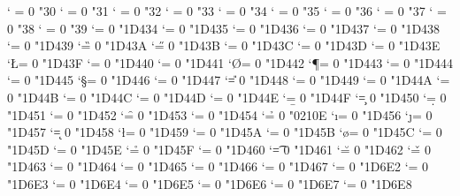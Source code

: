 \Umathcode `\0 = 0 \unimathfam "30
\Umathcode `\1 = 0 \unimathfam "31
\Umathcode `\2 = 0 \unimathfam "32
\Umathcode `\3 = 0 \unimathfam "33
\Umathcode `\4 = 0 \unimathfam "34
\Umathcode `\5 = 0 \unimathfam "35
\Umathcode `\6 = 0 \unimathfam "36
\Umathcode `\7 = 0 \unimathfam "37
\Umathcode `\8 = 0 \unimathfam "38
\Umathcode `\9 = 0 \unimathfam "39
\Umathcode `\A = 0 \unimathfam "1D434
\Umathcode `\B = 0 \unimathfam "1D435
\Umathcode `\C = 0 \unimathfam "1D436
\Umathcode `\D = 0 \unimathfam "1D437
\Umathcode `\E = 0 \unimathfam "1D438
\Umathcode `\F = 0 \unimathfam "1D439
\Umathcode `\G = 0 \unimathfam "1D43A
\Umathcode `\H = 0 \unimathfam "1D43B
\Umathcode `\I = 0 \unimathfam "1D43C
\Umathcode `\J = 0 \unimathfam "1D43D
\Umathcode `\K = 0 \unimathfam "1D43E
\Umathcode `\L = 0 \unimathfam "1D43F
\Umathcode `\M = 0 \unimathfam "1D440
\Umathcode `\N = 0 \unimathfam "1D441
\Umathcode `\O = 0 \unimathfam "1D442
\Umathcode `\P = 0 \unimathfam "1D443
\Umathcode `\Q = 0 \unimathfam "1D444
\Umathcode `\R = 0 \unimathfam "1D445
\Umathcode `\S = 0 \unimathfam "1D446
\Umathcode `\T = 0 \unimathfam "1D447
\Umathcode `\U = 0 \unimathfam "1D448
\Umathcode `\V = 0 \unimathfam "1D449
\Umathcode `\W = 0 \unimathfam "1D44A
\Umathcode `\X = 0 \unimathfam "1D44B
\Umathcode `\Y = 0 \unimathfam "1D44C
\Umathcode `\Z = 0 \unimathfam "1D44D
\Umathcode `\a = 0 \unimathfam "1D44E
\Umathcode `\b = 0 \unimathfam "1D44F
\Umathcode `\c = 0 \unimathfam "1D450
\Umathcode `\d = 0 \unimathfam "1D451
\Umathcode `\e = 0 \unimathfam "1D452
\Umathcode `\f = 0 \unimathfam "1D453
\Umathcode `\g = 0 \unimathfam "1D454
\Umathcode `\h = 0 \unimathfam "0210E %
\Umathcode `\i = 0 \unimathfam "1D456
\Umathcode `\j = 0 \unimathfam "1D457
\Umathcode `\k = 0 \unimathfam "1D458
\Umathcode `\l = 0 \unimathfam "1D459
\Umathcode `\m = 0 \unimathfam "1D45A
\Umathcode `\n = 0 \unimathfam "1D45B
\Umathcode `\o = 0 \unimathfam "1D45C
\Umathcode `\p = 0 \unimathfam "1D45D
\Umathcode `\q = 0 \unimathfam "1D45E
\Umathcode `\r = 0 \unimathfam "1D45F
\Umathcode `\s = 0 \unimathfam "1D460
\Umathcode `\t = 0 \unimathfam "1D461
\Umathcode `\u = 0 \unimathfam "1D462
\Umathcode `\v = 0 \unimathfam "1D463
\Umathcode `\w = 0 \unimathfam "1D464
\Umathcode `\x = 0 \unimathfam "1D465
\Umathcode `\y = 0 \unimathfam "1D466
\Umathcode `\z = 0 \unimathfam "1D467
\Umathcode `\Α = 0 \unimathfam "1D6E2
\Umathcode `\Β = 0 \unimathfam "1D6E3
\Umathcode `\Γ = 0 \unimathfam "1D6E4
\Umathcode `\Δ = 0 \unimathfam "1D6E5
\Umathcode `\Ε = 0 \unimathfam "1D6E6
\Umathcode `\Ζ = 0 \unimathfam "1D6E7
\Umathcode `\Η = 0 \unimathfam "1D6E8

